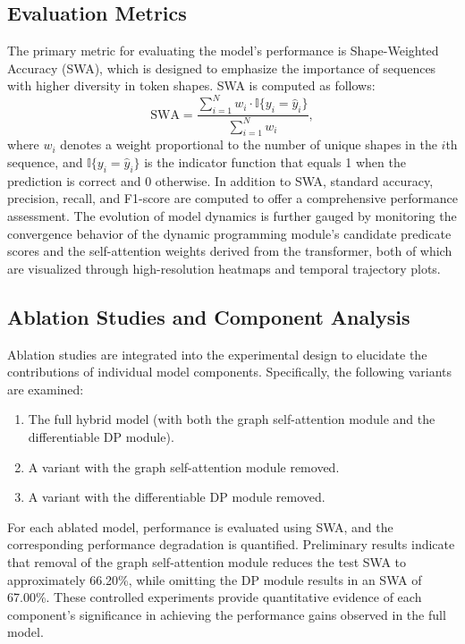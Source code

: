 \documentclass{article}
\begin{document}
\subsection{Evaluation Metrics}
The primary metric for evaluating the model’s performance is Shape-Weighted Accuracy (SWA), which is designed to emphasize the importance of sequences with higher diversity in token shapes. SWA is computed as follows:
\[
\text{SWA} = \frac{\sum_{i=1}^{N}w_i\cdot \mathbb{I}\{y_i=\hat{y}_i\}}{\sum_{i=1}^{N}w_i},
\]
where \(w_i\) denotes a weight proportional to the number of unique shapes in the \(i\)th sequence, and \(\mathbb{I}\{y_i=\hat{y}_i\}\) is the indicator function that equals 1 when the prediction is correct and 0 otherwise. In addition to SWA, standard accuracy, precision, recall, and F1-score are computed to offer a comprehensive performance assessment. The evolution of model dynamics is further gauged by monitoring the convergence behavior of the dynamic programming module’s candidate predicate scores and the self-attention weights derived from the transformer, both of which are visualized through high-resolution heatmaps and temporal trajectory plots.

\subsection{Ablation Studies and Component Analysis}
Ablation studies are integrated into the experimental design to elucidate the contributions of individual model components. Specifically, the following variants are examined:
\begin{enumerate}
    \item The full hybrid model (with both the graph self-attention module and the differentiable DP module).
    \item A variant with the graph self-attention module removed.
    \item A variant with the differentiable DP module removed.
\end{enumerate}
For each ablated model, performance is evaluated using SWA, and the corresponding performance degradation is quantified. Preliminary results indicate that removal of the graph self-attention module reduces the test SWA to approximately 66.20\%, while omitting the DP module results in an SWA of 67.00\%. These controlled experiments provide quantitative evidence of each component's significance in achieving the performance gains observed in the full model.
\end{document}
